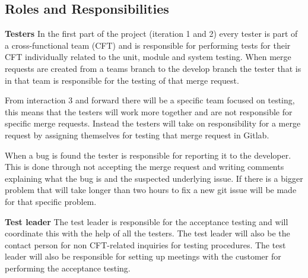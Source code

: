 
\subsection{Roles and Responsibilities}

\textbf{Testers}\newline
\noindent In the first part of the project (iteration 1 and 2) every tester is part of a cross-functional team (CFT) and is responsible for performing tests for their CFT individually related to the unit, module and system testing. When merge requests are created from a teams branch to the develop branch the tester that is in that team is responsible for the testing of that merge request. \newline

\noindent From interaction 3 and forward there will be a specific team focused on testing, this means that the testers will work more together and are not responsible for specific merge requests. Instead the testers will take on responsibility for a merge request by assigning themselves for testing that merge request in Gitlab. \newline

\noindent When a bug is found the tester is responsible for reporting it to the developer. This is done through not accepting the merge request and writing comments explaining what the bug is and the suspected underlying issue. If there is a bigger problem that will take longer than two hours to fix a new git issue will be made for that specific problem. \newline

\noindent \textbf{Test leader}\newline
\noindent The test leader is responsible for  the  acceptance  testing  and  will  coordinate  this  with  the  help  of  all  the  testers.  The  test leader will also be the contact person for non CFT-related inquiries for testing procedures. The test leader will also be responsible for setting up meetings with the customer for performing the acceptance testing.
